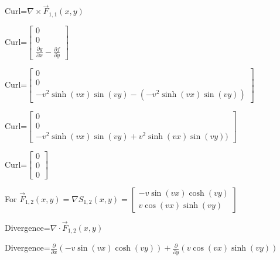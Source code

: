 \documentclass[12pt, executivepaper]{article}
\begin{document}
\begin{flushleft}
\vspace{3mm}

Curl=$\nabla \times \vec F_{1,1}(x,y)$ \\

\vspace{3mm}

Curl=$\begin{bmatrix}
0 \\
0 \\
\frac{\partial g}{\partial x}-\frac{\partial f}{\partial y}
\end{bmatrix}$ \\

\vspace{3mm}

Curl=$\begin{bmatrix}
0 \\
0 \\
-v^2\sinh(vx)\sin(vy)-(-v^2\sinh(vx)\sin(vy))
\end{bmatrix}$ \\

\vspace{3mm}

Curl=$\begin{bmatrix}
0 \\
0 \\
-v^2\sinh(vx)\sin(vy)+v^2\sinh(vx)\sin(vy))
\end{bmatrix}$ \\

\vspace{3mm}

Curl=$\begin{bmatrix}
0 \\
0 \\
0
\end{bmatrix}$ \\

\vspace{5mm}


For $\vec F_{1,2}(x,y)=\nabla S_{1,2}(x,y)=
\begin{bmatrix}
-v\sin(vx)\cosh(vy) \\
v\cos(vx)\sinh(vy)
\end{bmatrix}$

\vspace{3mm}

Divergence=$\nabla \cdot \vec F_{1,2}(x,y)$ \\

\vspace{3mm}

Divergence=$\frac{\partial}{\partial x}(-v\sin(vx)\cosh(vy))+\frac{\partial}{\partial y}(v\cos(vx)\sinh(vy))$ \\


\end{flushleft}
\end{document}
